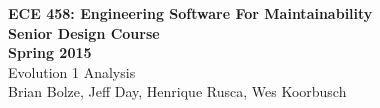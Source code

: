 \documentclass[11pt]{article}
\begin{document}
\begin{center}
\textbf{ECE 458: Engineering Software For Maintainability \\
Senior Design Course\\
Spring 2015\\[0.2in]}
Evolution 1 Analysis\\
Brian Bolze, Jeff Day, Henrique Rusca, Wes Koorbusch
\end{center}

\tableofcontents





\pagebreak
\end{document}
